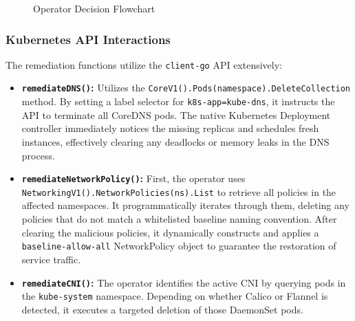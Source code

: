 \documentclass[12pt,a4paper]{article}
\begin{document}
\begin{figure}[h]
    \centering
    \caption{Operator Decision Flowchart}
    \label{fig:flowchart}
\end{figure}

\subsubsection{Kubernetes API Interactions}
The remediation functions utilize the \texttt{client-go} API extensively:
\begin{itemize}
    \item \textbf{\texttt{remediateDNS()}:} Utilizes the \texttt{CoreV1().Pods(namespace).DeleteCollection} method. By setting a label selector for \texttt{k8s-app=kube-dns}, it instructs the API to terminate all CoreDNS pods. The native Kubernetes Deployment controller immediately notices the missing replicas and schedules fresh instances, effectively clearing any deadlocks or memory leaks in the DNS process.
    \item \textbf{\texttt{remediateNetworkPolicy()}:} First, the operator uses \texttt{NetworkingV1().NetworkPolicies(ns).List} to retrieve all policies in the affected namespaces. It programmatically iterates through them, deleting any policies that do not match a whitelisted baseline naming convention. After clearing the malicious policies, it dynamically constructs and applies a \texttt{baseline-allow-all} NetworkPolicy object to guarantee the restoration of service traffic.
    \item \textbf{\texttt{remediateCNI()}:} The operator identifies the active CNI by querying pods in the \texttt{kube-system} namespace. Depending on whether Calico or Flannel is detected, it executes a targeted deletion of those DaemonSet pods.
\end{itemize}
\end{document}
